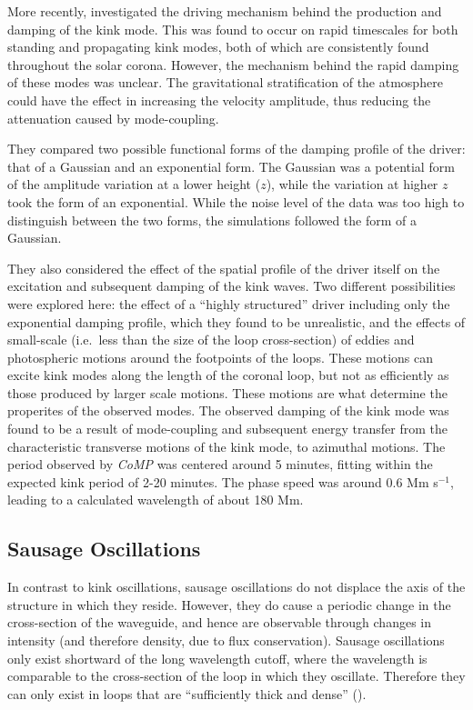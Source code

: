 \documentclass[preprint2]{aastex}
\begin{document}
More recently, \cite{kink_2} investigated the driving mechanism
behind the production and damping of the kink mode.
This was found to occur on rapid timescales for both standing
and propagating kink modes, both of which are consistently found
throughout the solar corona.
However, the mechanism behind the rapid damping of these modes was
unclear.
The gravitational stratification of the atmosphere could have
the effect in increasing the velocity amplitude, thus
reducing the attenuation caused by mode-coupling.

They compared two possible functional forms of the damping profile
of the driver: that of a Gaussian and an exponential form.
The Gaussian was a potential form of the amplitude variation at a
lower height ($z$), while the variation at higher $z$ took the
form of an exponential.
While the noise level of the data was too high to distinguish
between the two forms, the simulations followed the form of a
Gaussian.

They also considered the effect of the spatial profile of the driver
itself on the excitation and subsequent damping of the kink
waves. Two different possibilities were explored here:
the effect of a ``highly structured'' driver including only the
exponential damping profile, which they
found to be unrealistic, and
the effects of small-scale (i.e.\ less than the size of the loop cross-section)
of eddies and photospheric motions around the footpoints of the loops.
These motions can excite kink modes along the length of the coronal
loop, but not as efficiently as those produced by larger scale
motions. These motions are what determine the properites of the
observed modes.
The observed damping of the kink mode was found to be a result
of mode-coupling and subsequent energy transfer from the characteristic
transverse motions of the kink mode, to azimuthal motions.
The period observed by \emph{CoMP} was centered around
5 minutes, fitting within the expected kink period of 2-20 minutes.
The phase speed was around 0.6 Mm s$^{-1}$, leading to a calculated
wavelength of about 180 Mm.

\subsection{Sausage Oscillations}\label{sausage}
In contrast to kink oscillations, sausage oscillations do not displace
the axis of the structure in which they reside. However, they do cause
a periodic change in the cross-section of the waveguide, and hence
are observable through changes in intensity (and therefore density,
due to flux conservation). Sausage oscillations only exist shortward
of the long wavelength cutoff, where the wavelength is comparable to
the cross-section of the loop in which they oscillate. Therefore
they can only exist in loops that are ``sufficiently thick and dense''
(\cite{pfw_2}).
\end{document}
